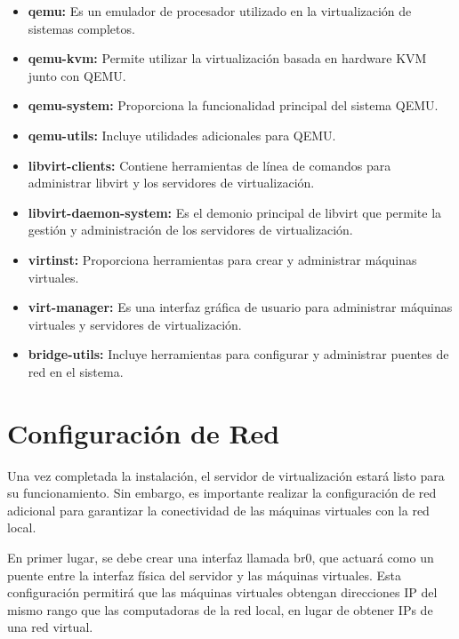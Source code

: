 				\begin{itemize}
			
					\item\textbf{qemu:} Es un emulador de procesador utilizado en la virtualización de sistemas completos.
	
					\item\textbf{qemu-kvm:} Permite utilizar la virtualización basada en hardware KVM junto con QEMU.
	
					\item\textbf{qemu-system:} Proporciona la funcionalidad principal del sistema QEMU.
	
					\item\textbf{qemu-utils:} Incluye utilidades adicionales para QEMU.
	
					\item\textbf{libvirt-clients:} Contiene herramientas de línea de comandos para administrar libvirt y los servidores de virtualización.
	
					\item\textbf{libvirt-daemon-system:} Es el demonio principal de libvirt que permite la gestión y administración de los servidores de virtualización.
	
					\item\textbf{virtinst:} Proporciona herramientas para crear y administrar máquinas virtuales.
	
					\item\textbf{virt-manager:} Es una interfaz gráfica de usuario para administrar máquinas virtuales y servidores de virtualización.
	
					\item\textbf{bridge-utils:} Incluye herramientas para configurar y administrar puentes de red en el sistema.
				
			\end{itemize}		
		
		
	\section{Conﬁguración de Red}
	
		Una vez completada la instalación, el servidor de virtualización estará listo para su funcionamiento. Sin embargo, es importante realizar la configuración de red adicional para garantizar la conectividad de las máquinas virtuales con la red local.\par
	
		En primer lugar, se debe crear una interfaz llamada br0, que actuará como un puente entre la interfaz física del servidor y las máquinas virtuales. Esta configuración permitirá que las máquinas virtuales obtengan direcciones IP del mismo rango que las computadoras de la red local, en lugar de obtener IPs de una red virtual.\par
	
